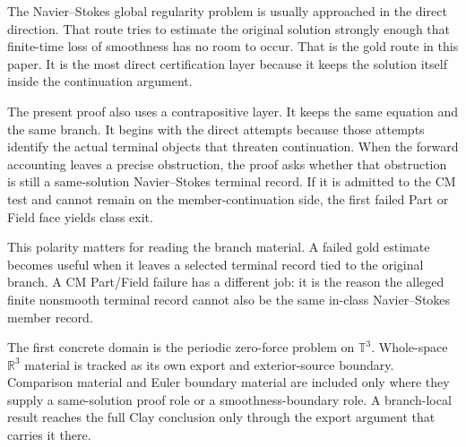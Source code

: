 The Navier--Stokes global regularity problem is usually approached in the direct direction.  That route tries to estimate the original solution strongly enough that finite-time loss of smoothness has no room to occur.  That is the gold route in this paper.  It is the most direct certification layer because it keeps the solution itself inside the continuation argument.

The present proof also uses a contrapositive layer.  It keeps the same equation and the same branch.  It begins with the direct attempts because those attempts identify the actual terminal objects that threaten continuation.  When the forward accounting leaves a precise obstruction, the proof asks whether that obstruction is still a same-solution Navier--Stokes terminal record.  If it is admitted to the CM test and cannot remain on the member-continuation side, the first failed Part or Field face yields class exit.

This polarity matters for reading the branch material.  A failed gold estimate becomes useful when it leaves a selected terminal record tied to the original branch.  A CM Part/Field failure has a different job: it is the reason the alleged finite nonsmooth terminal record cannot also be the same in-class Navier--Stokes member record.

The first concrete domain is the periodic zero-force problem on \(\mathbb T^3\).  Whole-space \(\mathbb R^3\) material is tracked as its own export and exterior-source boundary.  Comparison material and Euler boundary material are included only where they supply a same-solution proof role or a smoothness-boundary role.  A branch-local result reaches the full Clay conclusion only through the export argument that carries it there.
